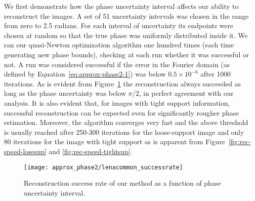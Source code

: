 We first demonstrate how the phase uncertainty interval affects our
ability to reconstruct the images. A set of 51 uncertainty intervals
was chosen in the range from zero to 2.5 radians. For each interval of
uncertainty its endpoints were chosen at random so that the true phase
was uniformly distributed inside it. We ran our quasi-Newton
optimization algorithm one hundred times (each time generating new
phase bounds), checking at each run whether it was successful
or not.  A run was considered successful if the error in the Fourier
domain (as defined by Equation~\eqref{eq:approx-phase2-1}) was below $0.5\times
10^{-6}$ after 1000 iterations. As is evident from
Figure~\ref{fig:rec-success-rate} the reconstruction always succeeded as
long as the phase uncertainty was below $\pi/2$, in perfect agreement with
our analysis. It is also evident that, for images with tight support
information, successful reconstruction can be expected even for
significantly rougher phase estimation. Moreover, the algorithm
converges very fast and the 
above threshold is usually reached after 250-300 iterations for the
loose-support image and only 80 iterations for the image with tight
support as is apparent from Figure~\ref{fig:rec-speed-losesup} and
\ref{fig:rec-speed-tightsup}.

\begin{figure}[H]
  \centering
  \texttt{[image: approx\_phase2/lenacommon\_successrate]}
  \caption[Success rate of our method]{Reconstruction success rate of our method as a function of
    phase uncertainty interval.}
  \label{fig:rec-success-rate}
\end{figure}

